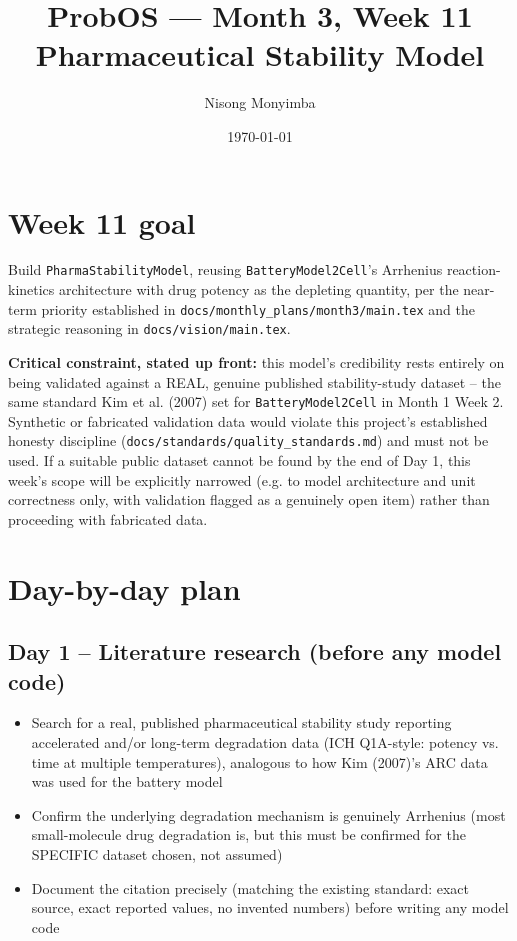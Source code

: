 \documentclass[11pt]{article}
\title{ProbOS --- Month 3, Week 11\\Pharmaceutical Stability Model}
\author{Nisong Monyimba}
\date{\today}
\begin{document}
\maketitle

\section*{Week 11 goal}
Build \texttt{PharmaStabilityModel}, reusing
\texttt{BatteryModel2Cell}'s Arrhenius reaction-kinetics architecture
with drug potency as the depleting quantity, per the near-term
priority established in \texttt{docs/monthly\_plans/month3/main.tex}
and the strategic reasoning in \texttt{docs/vision/main.tex}.

\textbf{Critical constraint, stated up front:} this model's
credibility rests entirely on being validated against a REAL,
genuine published stability-study dataset -- the same standard
Kim et al. (2007) set for \texttt{BatteryModel2Cell} in Month 1
Week 2. Synthetic or fabricated validation data would violate this
project's established honesty discipline
(\texttt{docs/standards/quality\_standards.md}) and must not be used.
If a suitable public dataset cannot be found by the end of Day 1,
this week's scope will be explicitly narrowed (e.g. to model
architecture and unit correctness only, with validation flagged as a
genuinely open item) rather than proceeding with fabricated data.

\section*{Day-by-day plan}

\subsection*{Day 1 -- Literature research (before any model code)}
\begin{itemize}[leftmargin=*]
  \item Search for a real, published pharmaceutical stability study
    reporting accelerated and/or long-term degradation data (ICH
    Q1A-style: potency vs. time at multiple temperatures), analogous
    to how Kim (2007)'s ARC data was used for the battery model
  \item Confirm the underlying degradation mechanism is genuinely
    Arrhenius (most small-molecule drug degradation is, but this must
    be confirmed for the SPECIFIC dataset chosen, not assumed)
  \item Document the citation precisely (matching the existing
    standard: exact source, exact reported values, no invented
    numbers) before writing any model code
\end{itemize}
\end{document}
